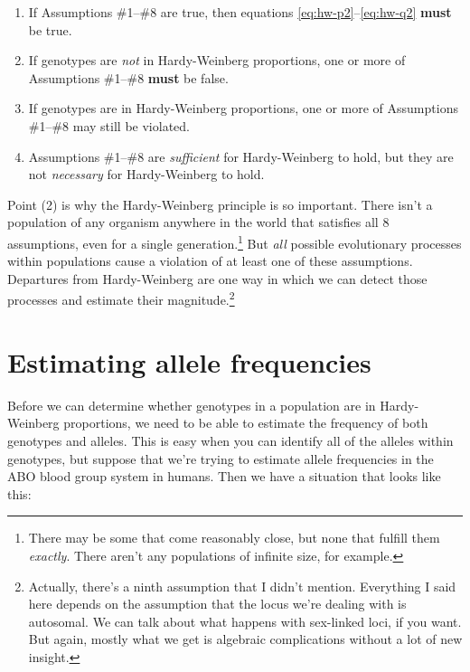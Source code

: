 \begin{enumerate}

\item If Assumptions \#1--\#8 are true, then equations
  \ref{eq:hw-p2}--\ref{eq:hw-q2} {\bf must} be true.

\item If genotypes are {\it not\/} in Hardy-Weinberg proportions, one
  or more of Assumptions \#1--\#8 {\bf must} be false.

\item If genotypes are in Hardy-Weinberg proportions, one or more of
  Assumptions \#1--\#8 may still be violated.

\item Assumptions \#1--\#8 are {\it sufficient\/} for Hardy-Weinberg
  to hold, but they are not {\it necessary\/} for Hardy-Weinberg to
  hold.

\end{enumerate}

Point (2) is why the Hardy-Weinberg principle is so important. There
isn't a population of any organism anywhere in the world that
satisfies all 8 assumptions, even for a single
generation.\footnote{There may be some that come reasonably close, but
  none that fulfill them {\it exactly}. There aren't any populations
  of infinite size, for example.}  But {\it all\/} possible
evolutionary processes within populations cause a violation of at
least one of these assumptions. Departures from Hardy-Weinberg are one
way in which we can detect those processes and estimate their
magnitude.\footnote{Actually, there's a ninth assumption that I didn't
  mention. Everything I said here depends on the assumption that the
  locus we're dealing with is autosomal. We can talk about what
  happens with sex-linked loci, if you want. But again, mostly what we
  get is algebraic complications without a lot of new insight.}

\section*{Estimating allele frequencies}

Before we can determine whether genotypes in a population are in
Hardy-Weinberg proportions, we need to be able to estimate the
frequency of both genotypes and alleles. This is easy when you can
identify all of the alleles within genotypes, but suppose that we're
trying to estimate allele frequencies in the ABO blood group system in
humans. Then we have a situation that looks like this:


